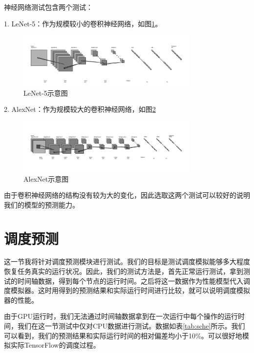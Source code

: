     神经网络测试包含两个测试：
    
    1. LeNet-5：作为规模较小的卷积神经网络，如图\ref{fig:lenet5_str}。

    \begin{figure}[!htbp]
        \centering
        \includegraphics[width=0.8\textwidth]{figures/lenet5_str.png}
        \caption{LeNet-5示意图}
        \label{fig:lenet5_str}
    \end{figure}
    
    2. AlexNet：作为规模较大的卷积神经网络，如图\ref{fig:alexnet_str}

    \begin{figure}[!htbp]
        \centering
        \includegraphics[width=0.8\textwidth]{figures/alexnet_str.png}
        \caption{AlexNet示意图}
        \label{fig:alexnet_str}
    \end{figure}
    
    由于卷积神经网络的结构没有较为大的变化，因此选取这两个测试可以较好的说明我们的模型的预测能力。

\section{调度预测}
    这一节我将针对调度预测模块进行测试。我们的目标是测试调度模拟能够多大程度恢复任务真实的运行状况。因此，我们的测试方法是，首先正常运行测试，拿到测试的时间轴数据，得到每个节点的运行时间。之后将这一数据作为性能模型代入调度模拟器。这时用得到的预测结果和实际运行时间进行比较，就可以说明调度模拟器的性能。
    
    由于GPU运行时，我们无法通过时间轴数据拿到在一次运行中每个操作的运行时间，我们在这一节测试中仅对CPU数据进行测试。数据如表\ref{tab:sche}所示。我们可以看到，我们的预测结果和实际运行时间的相对偏差均小于10\%。可以很好地模拟实际TensorFlow的调度过程。
    
